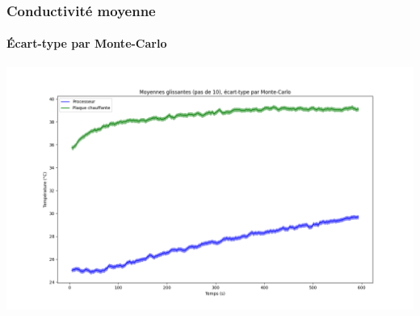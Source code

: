 \documentclass[a4paper,11pt]{beamer}
\begin{document}
\begin{frame}
    \frametitle{Conductivité moyenne}
    \framesubtitle{Écart-type par Monte-Carlo}

    \includegraphics[width=\textwidth]{moyennes_glissantes_monte_carlo.png}
\end{frame}
\end{document}
